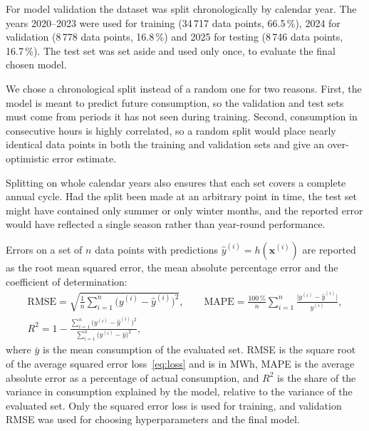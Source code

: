 \documentclass[10pt,a4paper]{article}
\begin{document}
For model validation the dataset was split chronologically by calendar year. The years
2020--2023 were used for training (34\,717 data points, 66.5\,\%), 2024 for validation
(8\,778 data points, 16.8\,\%) and 2025 for testing (8\,746 data points, 16.7\,\%). The
test set was set aside and used only once, to evaluate the final chosen model.

We chose a chronological split instead of a random one for two reasons. First, the model is
meant to predict future consumption, so the validation and test sets must come from periods
it has not seen during training. Second, consumption in consecutive hours is highly
correlated, so a random split would place nearly identical data points in both the training
and validation sets and give an over-optimistic error estimate.

Splitting on whole calendar years also ensures that each set covers a complete annual cycle.
Had the split been made at an arbitrary point in time, the test set might have contained only
summer or only winter months, and the reported error would have reflected a single season
rather than year-round performance.

Errors on a set of $n$ data points with predictions $\hat{y}^{(i)} = h(\mathbf{x}^{(i)})$ are
reported as the root mean squared error, the mean absolute percentage error and the
coefficient of determination:
\begin{equation}
  \begin{gathered}
  \text{RMSE} = \sqrt{\frac{1}{n}\sum_{i=1}^{n} \bigl(y^{(i)} - \hat{y}^{(i)}\bigr)^2},
  \qquad
  \text{MAPE} = \frac{100\,\%}{n}\sum_{i=1}^{n} \frac{\bigl|y^{(i)} - \hat{y}^{(i)}\bigr|}{y^{(i)}},
  \\[0.5em]
  R^2 = 1 - \frac{\sum_{i=1}^{n} \bigl(y^{(i)} - \hat{y}^{(i)}\bigr)^2}{\sum_{i=1}^{n} \bigl(y^{(i)} - \bar{y}\bigr)^2},
  \end{gathered}
  \label{eq:metrics}
\end{equation}
where $\bar{y}$ is the mean consumption of the evaluated set. RMSE is the square root of the
average squared error loss~\eqref{eq:loss} and is in MWh, MAPE is the average absolute error
as a percentage of actual consumption, and $R^2$ is the share of the variance in consumption
explained by the model, relative to the variance of the evaluated set. Only the squared error
loss is used for training, and validation RMSE was used for choosing hyperparameters and the
final model.

\end{document}
